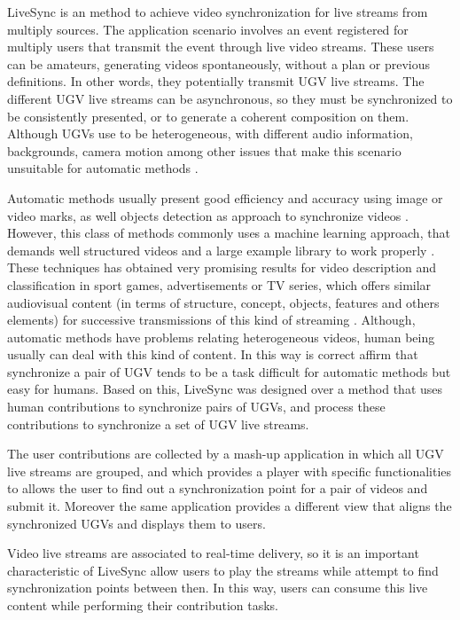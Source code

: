 
LiveSync is an method to achieve video synchronization for live streams from multiply sources. The application scenario involves an event registered for multiply users that transmit the event through live video streams. These users can be amateurs, generating videos spontaneously, without a plan or previous definitions. In other words, they potentially transmit UGV live streams. The different UGV live streams can be asynchronous, so they must be synchronized to be consistently presented, or to generate a coherent composition on them. Although UGVs use to be heterogeneous, with different audio information, backgrounds, camera motion among other issues that make this scenario unsuitable for automatic methods \cite{schweiger2013fully}.

Automatic methods usually present good efficiency and accuracy using image or video marks, as well objects detection as approach to synchronize videos \cite{key:article}. However, this class of methods commonly uses a machine learning approach, that demands well structured videos and a large example library to work properly \cite{KarpathyCVPR14}. These techniques has obtained very promising results for video description and classification in sport games, advertisements or TV series, which offers similar audiovisual content (in terms of structure, concept, objects, features and others elements) for successive transmissions of this kind of streaming \cite{6909619}. Although, automatic methods have problems relating heterogeneous videos,  human being usually can deal with this kind of content. In this way is correct affirm that synchronize a pair of UGV tends to be a task difficult for automatic methods but easy for humans. Based on this, LiveSync was designed over a method that uses human contributions to synchronize pairs of UGVs, and process these contributions to synchronize a set of UGV live streams.

The user contributions are collected by a mash-up application in which all UGV live streams are grouped, and which provides a player with specific functionalities to allows the user to find out a synchronization point for a pair of videos and submit it. Moreover the same application provides a different view that aligns the synchronized UGVs and displays them to users.


Video live streams are associated to real-time delivery, so it is an important characteristic of LiveSync allow users to play the streams while attempt to find synchronization points between then. In this way, users can consume this live content while performing their contribution tasks.

